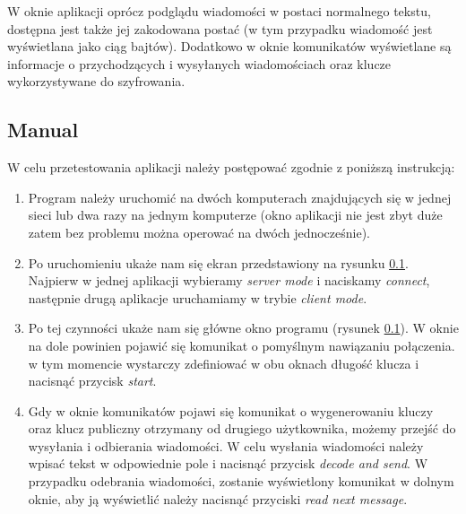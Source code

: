 \documentclass[10pt,a4paper]{article}
\begin{document}
W oknie aplikacji oprócz podglądu wiadomości w postaci normalnego tekstu, dostępna jest także jej zakodowana postać (w tym przypadku wiadomość jest wyświetlana jako ciąg bajtów). Dodatkowo w oknie komunikatów wyświetlane są informacje o przychodzących i wysyłanych wiadomościach oraz klucze wykorzystywane do szyfrowania. 

\subsection{Manual}

W celu przetestowania aplikacji należy postępować zgodnie z poniższą instrukcją:

\begin{enumerate}
\item Program należy uruchomić na dwóch komputerach znajdujących się w jednej sieci lub dwa razy na jednym komputerze (okno aplikacji nie jest zbyt duże zatem bez problemu można operować na dwóch jednocześnie).

\item Po uruchomieniu ukaże nam się ekran przedstawiony na rysunku \ref{}. Najpierw w jednej aplikacji wybieramy \textit{server mode} i naciskamy \textit{connect}, następnie drugą aplikacje uruchamiamy w trybie \textit{client mode}.

\item Po tej czynności ukaże nam się główne okno programu (rysunek \ref{}). W oknie na dole powinien pojawić się komunikat o pomyślnym nawiązaniu połączenia. w tym momencie wystarczy zdefiniować w obu oknach długość klucza i nacisnąć przycisk \textit{start}.

\item Gdy w oknie komunikatów pojawi się komunikat o wygenerowaniu kluczy oraz klucz publiczny otrzymany od drugiego użytkownika, możemy przejść do wysyłania i odbierania wiadomości. W celu wysłania wiadomości należy wpisać tekst w odpowiednie pole i nacisnąć przycisk \textit{decode and send}. W przypadku odebrania wiadomości, zostanie wyświetlony komunikat w dolnym oknie, aby ją wyświetlić należy nacisnąć przyciski \textit{read next message}.
\end{enumerate}

	
\end{document}
